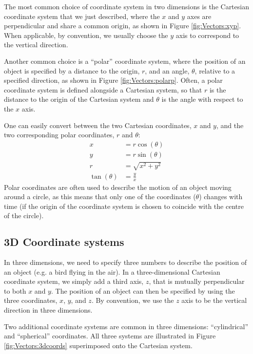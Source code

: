 The most common choice of coordinate system in two dimensions is the Cartesian coordinate system that we just described, where the $x$ and $y$ axes are perpendicular and share a common origin, as shown in Figure \ref{fig:Vectors:xyp}. When applicable, by convention, we usually choose the $y$ axis to correspond to the vertical direction.

Another common choice is a ``polar'' coordinate system, where the position of an object is specified by a distance to the origin, $r$, and an angle, $\theta$, relative to a specified direction, as shown in Figure \ref{fig:Vectors:polarp}. Often, a polar coordinate system is defined alongside a Cartesian system, so that $r$ is the distance to the origin of the Cartesian system and $\theta$ is the angle with respect to the $x$ axis.



One can easily convert between the two Cartesian coordinates, $x$ and $y$, and the two corresponding polar coordinates, $r$ and $\theta$:
\begin{align*}
x&=r\cos(\theta)\\
y&=r\sin(\theta)\\
r&=\sqrt{x^2+y^2}\\
\tan(\theta) &= \frac{y}{x}
\end{align*}
Polar coordinates are often used to describe the motion of an object moving around a circle, as this means that only one of the coordinates ($\theta$) changes with time (if the origin of the coordinate system is chosen to coincide with the centre of the circle).

\subsection{3D Coordinate systems}
In three dimensions, we need to specify three numbers to describe the position of an object (e.g. a bird flying in the air). In a three-dimensional Cartesian coordinate system, we simply add a third axis, $z$, that is mutually perpendicular to both $x$ and $y$. The position of an object can then be specified by using the three coordinates, $x$, $y$, and $z$. By convention, we use the $z$ axis to be the vertical direction in three dimensions.

Two additional coordinate systems are common in three dimensions: ``cylindrical'' and ``spherical'' coordinates. All three systems are illustrated in Figure \ref{fig:Vectors:3dcoords} superimposed onto the Cartesian system.

